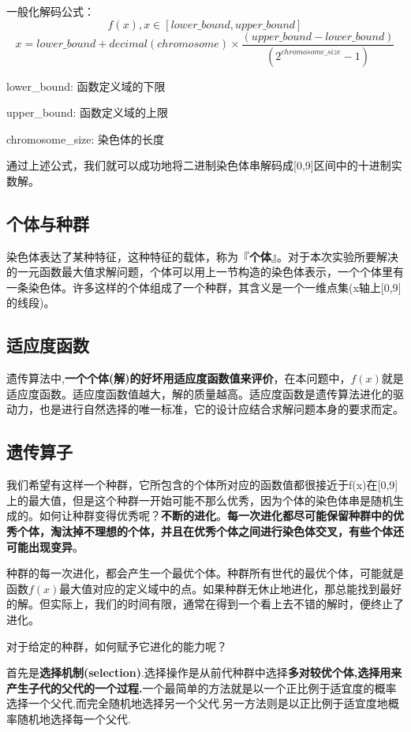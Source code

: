\documentclass[11pt,a4paper,oneside]{book}
\begin{document}
一般化解码公式：
\begin{equation}
f(x), x\in[lower\_bound, upper\_bound]
\end{equation}
\begin{equation}
x = lower\_bound+decimal(chromosome)\times\frac{(upper\_bound-lower\_bound)}{(2^{chromosome\_size}-1)}
\end{equation}

lower\_bound: 函数定义域的下限

upper\_bound: 函数定义域的上限

chromosome\_size: 染色体的长度

通过上述公式，我们就可以成功地将二进制染色体串解码成[0,9]区间中的十进制实数解。


\subsection{个体与种群}
染色体表达了某种特征，这种特征的载体，称为『\textbf{个体}』。对于本次实验所要解决的一元函数最大值求解问题，个体可以用上一节构造的染色体表示，一个个体里有一条染色体。许多这样的个体组成了一个种群，其含义是一个一维点集(x轴上[0,9]的线段)。

\subsection{适应度函数}
遗传算法中,\textbf{一个个体(解)的好坏用适应度函数值来评价}，在本问题中，$ f(x) $就是适应度函数。适应度函数值越大，解的质量越高。适应度函数是遗传算法进化的驱动力，也是进行自然选择的唯一标准，它的设计应结合求解问题本身的要求而定。

\subsection{遗传算子}
我们希望有这样一个种群，它所包含的个体所对应的函数值都很接近于f(x)在[0,9]上的最大值，但是这个种群一开始可能不那么优秀，因为个体的染色体串是随机生成的。如何让种群变得优秀呢？\textbf{不断的进化}。\textbf{每一次进化都尽可能保留种群中的优秀个体，淘汰掉不理想的个体，并且在优秀个体之间进行染色体交叉，有些个体还可能出现变异}。

种群的每一次进化，都会产生一个最优个体。种群所有世代的最优个体，可能就是函数$ f(x) $最大值对应的定义域中的点。如果种群无休止地进化，那总能找到最好的解。但实际上，我们的时间有限，通常在得到一个看上去不错的解时，便终止了进化。

对于给定的种群，如何赋予它进化的能力呢？

首先是\textbf{选择机制(selection)}.选择操作是从前代种群中选择\textbf{多对较优个体,选择用来产生子代的父代的一个过程.}一个最简单的方法就是以一个正比例于适宜度的概率选择一个父代,而完全随机地选择另一个父代.另一方法则是以正比例于适宜度地概率随机地选择每一个父代.
\end{document}
